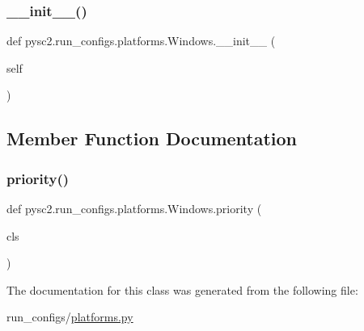 \subsubsection{\texorpdfstring{\+\_\+\+\_\+init\+\_\+\+\_\+()}{\_\_init\_\_()}}
{\footnotesize\ttfamily def pysc2.\+run\+\_\+configs.\+platforms.\+Windows.\+\_\+\+\_\+init\+\_\+\+\_\+ (\begin{DoxyParamCaption}\item[{}]{self }\end{DoxyParamCaption})}



\subsection{Member Function Documentation}
\mbox{\label{classpysc2_1_1run__configs_1_1platforms_1_1_windows_aeed882f1f779c7209baad142fcf49a43}} 
\subsubsection{\texorpdfstring{priority()}{priority()}}
{\footnotesize\ttfamily def pysc2.\+run\+\_\+configs.\+platforms.\+Windows.\+priority (\begin{DoxyParamCaption}\item[{}]{cls }\end{DoxyParamCaption})}



The documentation for this class was generated from the following file\+:\begin{DoxyCompactItemize}
\item 
run\+\_\+configs/\mbox{\hyperlink{platforms_8py}{platforms.\+py}}\end{DoxyCompactItemize}
